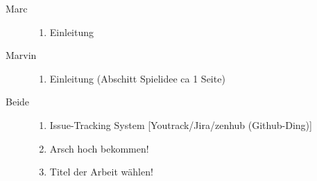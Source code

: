 \begin{description}
	\item[Marc]{
		\begin{enumerate}
			\item{ Einleitung }
		\end{enumerate}
	}
	\item[Marvin]{
		\begin{enumerate}
			\item{ Einleitung (Abschitt Spielidee ca 1 Seite) }
		\end{enumerate}
	}
	\item[Beide]{
		\begin{enumerate}
			\item{Issue-Tracking System [Youtrack/Jira/zenhub (Github-Ding)]}
			\item{Arsch hoch bekommen!}
			\item{Titel der Arbeit wählen!}
		\end{enumerate}
	}
\end{description}
